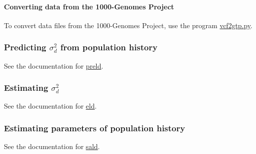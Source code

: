 \paragraph*{Converting data from the 1000-\/\-Genomes Project}

To convert data files from the 1000-\/\-Genomes Project, use the program \hyperlink{vcf2gtp_8py_vcf2gtp}{vcf2gtp.py}.

\subsubsection*{Predicting $\sigma_d^2$ from population history}

See the documentation for \hyperlink{preld_8c_preld}{preld}.

\subsubsection*{Estimating $\sigma_d^2$}

See the documentation for \hyperlink{eld_8c_eld}{eld}.

\subsubsection*{Estimating parameters of population history}

See the documentation for \hyperlink{sald_8c_sald}{sald}. 